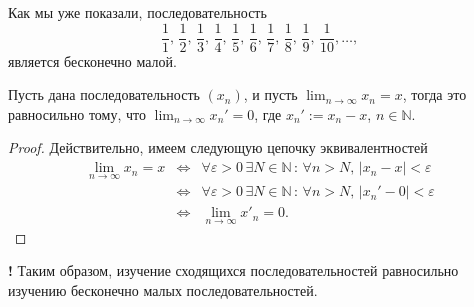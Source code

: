 Как мы уже показали, последовательность
 \[
      \frac{1}{1}, \,\frac{1}{2}, \,\frac{1}{3}, \, \frac{1}{4}, \, \frac{1}{5}, \, \frac{1}{6},\, \frac{1}{7},\, \frac{1}{8},\, \frac{1}{9},\, \frac{1}{10},  \ldots,
    \]
является бесконечно малой.

\begin{proposition}\label{lim(a_n-a)=0}
    Пусть дана последовательность $(x_n)$, и пусть $\lim_{n\to \infty}x_n = x$, тогда это равносильно тому, что $\lim_{n\to \infty}x_n' = 0$, где $x_n' := x_n - x$, $n\in \mathbb{N}.$
\end{proposition}
\begin{proof}
    Действительно, имеем следующую цепочку эквивалентностей
    \begin{eqnarray*}
      \lim_{n \to \infty} x_n = x & \Longleftrightarrow &  \forall \varepsilon >0\, \exists N \in \mathbb{N}\, :\, \forall n >N, \, |x_n - x| <\varepsilon \\
      &\Longleftrightarrow& \forall \varepsilon >0\, \exists N \in \mathbb{N}\, :\, \forall n >N, \, |x_n' - 0| <\varepsilon \\
      &\Longleftrightarrow &  \lim_{n \to \infty} x'_n = 0.
    \end{eqnarray*}
\end{proof}

\begin{mydanger}{\color{blue}\bf !}
    Таким образом, изучение сходящихся последовательностей равносильно изучению бесконечно малых последовательностей.
\end{mydanger}


